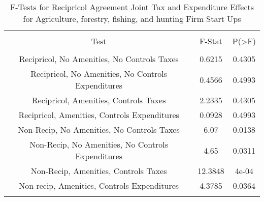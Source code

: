 
\begin{table}[!htbp] \centering 
  \caption{F-Tests for Recipricol Agreement Joint Tax and Expenditure Effects for Agriculture, forestry, fishing, and hunting Firm Start Ups} 
  \label{11Ftests} 
\begin{tabular}{@{\extracolsep{5pt}} ccc} 
\\[-1.8ex]\hline 
\hline \\[-1.8ex] 
Test & F-Stat & P(\textgreater F) \\ 
\hline \\[-1.8ex] 
Recipricol, No Amenities, No Controls Taxes & 0.6215 & 0.4305 \\ 
Recipricol, No Amenities, No Controls Expenditures & 0.4566 & 0.4993 \\ 
Recipricol, Amenities, Controls Taxes & 2.2335 & 0.4305 \\ 
Recipricol, Amenities, Controls Expenditures & 0.0928 & 0.4993 \\ 
Non-Recip, No Amenities, No Controls Taxes & 6.07 & 0.0138 \\ 
Non-Recip, No Amenities, No Controls Expenditures & 4.65 & 0.0311 \\ 
Non-Recip, Amenities, Controls Taxes & 12.3848 & 4e-04 \\ 
Non-recip, Amenities, Controls Expenditures & 4.3785 & 0.0364 \\ 
\hline \\[-1.8ex] 
\end{tabular} 
\end{table} 
